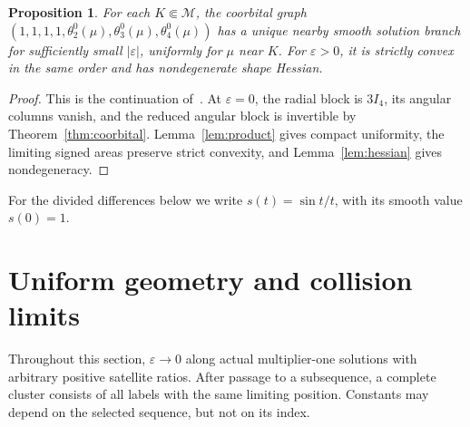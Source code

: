 \documentclass[11pt,a4paper]{article}
\numberwithin{equation}{section}
\newtheorem{proposition}[theorem]{Proposition}
\theoremstyle{remark}
\newcommand{\M}{\mathcal M}
\newcommand{\eps}{\varepsilon}
\begin{document}
\begin{proposition}\label{prop:local}
For each $K\Subset\M$, the coorbital graph
$(1,1,1,1,\theta_2^0(\mu),\theta_3^0(\mu),\theta_4^0(\mu))$
has a unique nearby smooth solution branch for sufficiently small $|\eps|$, uniformly for $\mu$ near $K$. For $\eps>0$, it is strictly convex in the same order and has nondegenerate shape Hessian.
\end{proposition}
\begin{proof}
This is the continuation of~\cite[Proposition~1 and its proof]{CCLM}.
At $\eps=0$, the radial block is $3I_4$, its angular columns vanish, and the reduced angular block is invertible by Theorem~\ref{thm:coorbital}. Lemma~\ref{lem:product} gives compact uniformity, the limiting signed areas preserve strict convexity, and Lemma~\ref{lem:hessian} gives nondegeneracy.
\end{proof}

For the divided differences below we write
$s(t)=\sin t/t$, with its smooth value $s(0)=1$.

\section{Uniform geometry and collision limits}
\label{sec:limits}
Throughout this section, $\eps\to0$ along actual multiplier-one solutions with arbitrary positive satellite ratios. After passage to a subsequence, a complete cluster consists of all labels with the same limiting position. Constants may depend on the selected sequence, but not on its index.
\end{document}
